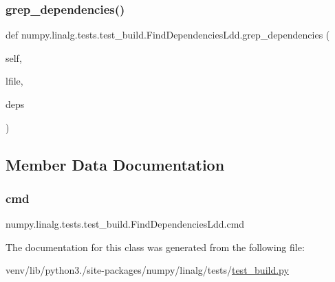\subsubsection{\texorpdfstring{grep\+\_\+dependencies()}{grep\_dependencies()}}
{\footnotesize\ttfamily def numpy.\+linalg.\+tests.\+test\+\_\+build.\+Find\+Dependencies\+Ldd.\+grep\+\_\+dependencies (\begin{DoxyParamCaption}\item[{}]{self,  }\item[{}]{lfile,  }\item[{}]{deps }\end{DoxyParamCaption})}



\subsection{Member Data Documentation}
\mbox{\label{classnumpy_1_1linalg_1_1tests_1_1test__build_1_1FindDependenciesLdd_a8e977aded0e6e3671d273b837dac2c95}} 
\subsubsection{\texorpdfstring{cmd}{cmd}}
{\footnotesize\ttfamily numpy.\+linalg.\+tests.\+test\+\_\+build.\+Find\+Dependencies\+Ldd.\+cmd}



The documentation for this class was generated from the following file\+:\begin{DoxyCompactItemize}
\item 
venv/lib/python3./site-\/packages/numpy/linalg/tests/\hyperlink{test__build_8py}{test\+\_\+build.\+py}\end{DoxyCompactItemize}
